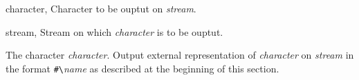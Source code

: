 \begin{optDefinition}
%
\begin{specargs}
    \item[character, \classref{character}] Character to be ouptut on {\em
        stream}.
    \item[stream, \classref{stream}] Stream on which {\em character\/} is to be
    ouptut.
\end{specargs}
%
\result%
The character {\em character}.
%
\remarks%
Output external representation of {\em character\/} on {\em stream\/} in the
format \verb+#\+{\em{}name\/} as described at the beginning of this section.
%
\end{optDefinition}
